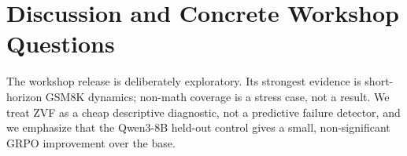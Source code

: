 \section{Discussion and Concrete Workshop Questions}
\label{sec:conclusion}

The workshop release is deliberately exploratory. Its strongest evidence is
short-horizon GSM8K dynamics; non-math coverage is a stress case, not a
result. We treat ZVF as a cheap descriptive diagnostic, not a predictive
failure detector, and we emphasize that the Qwen3-8B held-out control gives
a small, non-significant GRPO improvement over the base.

